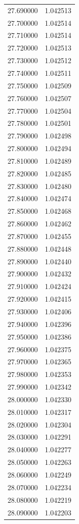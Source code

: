 \begin{tabular}{rr}
27.690000 & 1.042513 \\
27.700000 & 1.042514 \\
27.710000 & 1.042514 \\
27.720000 & 1.042513 \\
27.730000 & 1.042512 \\
27.740000 & 1.042511 \\
27.750000 & 1.042509 \\
27.760000 & 1.042507 \\
27.770000 & 1.042504 \\
27.780000 & 1.042501 \\
27.790000 & 1.042498 \\
27.800000 & 1.042494 \\
27.810000 & 1.042489 \\
27.820000 & 1.042485 \\
27.830000 & 1.042480 \\
27.840000 & 1.042474 \\
27.850000 & 1.042468 \\
27.860000 & 1.042462 \\
27.870000 & 1.042455 \\
27.880000 & 1.042448 \\
27.890000 & 1.042440 \\
27.900000 & 1.042432 \\
27.910000 & 1.042424 \\
27.920000 & 1.042415 \\
27.930000 & 1.042406 \\
27.940000 & 1.042396 \\
27.950000 & 1.042386 \\
27.960000 & 1.042375 \\
27.970000 & 1.042365 \\
27.980000 & 1.042353 \\
27.990000 & 1.042342 \\
28.000000 & 1.042330 \\
28.010000 & 1.042317 \\
28.020000 & 1.042304 \\
28.030000 & 1.042291 \\
28.040000 & 1.042277 \\
28.050000 & 1.042263 \\
28.060000 & 1.042249 \\
28.070000 & 1.042234 \\
28.080000 & 1.042219 \\
28.090000 & 1.042203 \\

\end{tabular}
